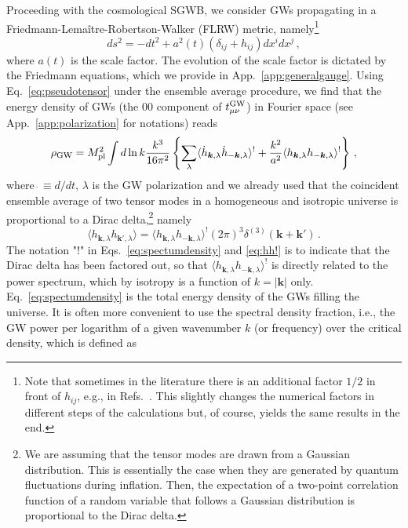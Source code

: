 \documentclass[a4paper,11pt]{article}
\numberwithin{equation}{section}
\begin{document}
Proceeding with the cosmological SGWB, we consider GWs propagating in a Friedmann-Lema{\^i}tre-Robertson-Walker (FLRW) metric, namely\footnote{Note that sometimes in the literature there is an additional factor $1/2$ in front of $h_{ij}$, e.g., in Refs.~\cite{Ananda:2006af,Kohri:2018awv}. This slightly changes the numerical factors in different steps of the calculations but, of course, yields the same results in the end.}
\begin{equation}\label{eq:FLRW}
 ds^2=-dt^2+a^2(t)(\delta_{ij}+h_{ij})dx^idx^j\,,
\end{equation} 
where $a(t)$ is the scale factor. The evolution of the scale factor is dictated by the Friedmann equations, which we provide in App.~\ref{app:generalgauge}. Using Eq.~\eqref{eq:pseudotensor} under the ensemble average procedure, we find that the energy density of GWs (the $00$ component of $t_{\mu\nu}^{\rm GW}$) in Fourier space (see App.~\ref{app:polarization} for notations) reads
\begin{equation}\label{eq:spectumdensity}
\rho_{\rm GW}=M_{\rm pl}^2\int d\ln k \frac{k^3}{16\pi^2}\left\{\sum_\lambda\langle \dot h_{\bm{k},\lambda}\dot h_{-\bm{k},\lambda}\rangle^{!}+ \frac{k^2}{a^2} \langle h_{\bm{k},\lambda}h_{-\bm{k},\lambda}\rangle^{!}\right\}\,,
\end{equation}
where $\dot\,\equiv d/dt$, $\lambda$ is the GW polarization and we already used that the coincident ensemble average of two tensor modes in a homogeneous and isotropic universe is proportional to a Dirac delta,\footnote{We are assuming that the tensor modes are drawn from a Gaussian distribution. This is essentially the case when they are generated by quantum fluctuations during inflation. Then, the expectation of a two-point correlation function of a random variable that follows a Gaussian distribution is proportional to the Dirac delta.} namely
\begin{equation}\label{eq:hh!}
\langle h_{\bm{k},\lambda}h_{\bm{k}',\lambda}\rangle= \langle h_{\bm{k},\lambda}h_{-\bm{k},\lambda}\rangle^{!}(2\pi)^3\delta^{(3)}(\bm{k}+\bm{k'})\,.
\end{equation}
The notation "!" in Eqs.~\eqref{eq:spectumdensity} and \eqref{eq:hh!} is to indicate that the Dirac delta has been factored out, so that $\langle h_{\bm{k},\lambda}h_{-\bm{k},\lambda}\rangle^{!}$ is directly related to the power spectrum, which by isotropy is a function of $k=|\bm{k}|$ only.
Eq.~\eqref{eq:spectumdensity} is the total energy density of the GWs filling the universe. It is often more convenient to use the spectral density fraction, i.e., the GW power per logarithm of a given wavenumber $k$ (or frequency) over the critical density, which is defined as
\end{document}
